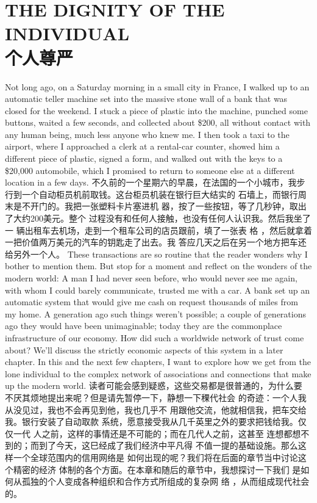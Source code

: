 \chapter{THE DIGNITY OF THE INDIVIDUAL\\个人尊严}
\begin{paracol}{2}

Not long ago, on a Saturday morning in a small city in
France, I walked up to an automatic teller machine
set into the massive stone wall of a bank that was closed for the
weekend. I stuck a piece of plastic into the machine, punched
some buttons, waited a few seconds, and collected about \$200,
all without contact with any human being, much less anyone
who knew me. I then took a taxi to the airport, where I approached a clerk at a rental-car counter, showed him a different
piece of plastic, signed a form, and walked out with the keys to
a \$20,000 automobile, which I promised to return to someone
else at a different location in a few days.
\switchcolumn
不久前的一个星期六的早晨，在法国的一个小城市，我步
行到一个自动柜员机前取钱。这台柜员机装在银行巨大结实的
石墙上，而银行周末是不开门的。我把一张塑料卡片塞进机
器，按了一些按钮，等了几秒钟，取出了大约200美元。整个
过程没有和任何人接触，也没有任何人认识我。然后我坐了一
辆出租车去机场，走到一个租车公司的店员跟前，填了一张表
格 ，然后就拿着一把价值两万美元的汽车的钥匙走了出去。我
答应几天之后在另一个地方把车还给另外一个人。
\switchcolumn*
These transactions are so routine that the reader wonders
why I bother to mention them. But stop for a moment and reflect on the wonders of the modern world: A man I had never
seen before, who would never see me again, with whom I could
barely communicate, trusted me with a car. A bank set up an
automatic system that would give me cash on request thousands of miles from my home. A generation ago such things
weren't possible; a couple of generations ago they would have
been unimaginable; today they are the commonplace infrastructure of our economy. How did such a worldwide network
of trust come about? We'll discuss the strictly economic aspects
of this system in a later chapter. In this and the next few chapters, I want to explore how we get from the lone individual to
the complex network of associations and connections that make
up the modern world.
\switchcolumn
读者可能会感到疑惑，这些交易都是很普通的，为什么要
不厌其烦地提出来呢？但是请先暂停一下，静想一下稞代社会
的奇迹：一个人我从没见过，我也不会再见到他，我也几乎不
用跟他交流，他就相信我，把车交给我。银行安装了自动取款
系统，愿意接受我从几千英里之外的要求把钱给我。仅仅一代
人之前，这样的事情还是不可能的；而在几代人之前，这甚至
连想都想不到的；而到了今天，这巳经成了我们经济中平凡得
不值一提的基础设施。那么这样一个全球范围内的信用网络是
如何出现的呢？我们将在后面的章节当中讨论这个精密的经济
体制的各个方面。在本章和随后的章节中，我想探讨一下我们
是如何从孤独的个人变成各种组织和合作方式所组成的复杂网
络 ，从而组成现代社会的。


\end{paracol}
